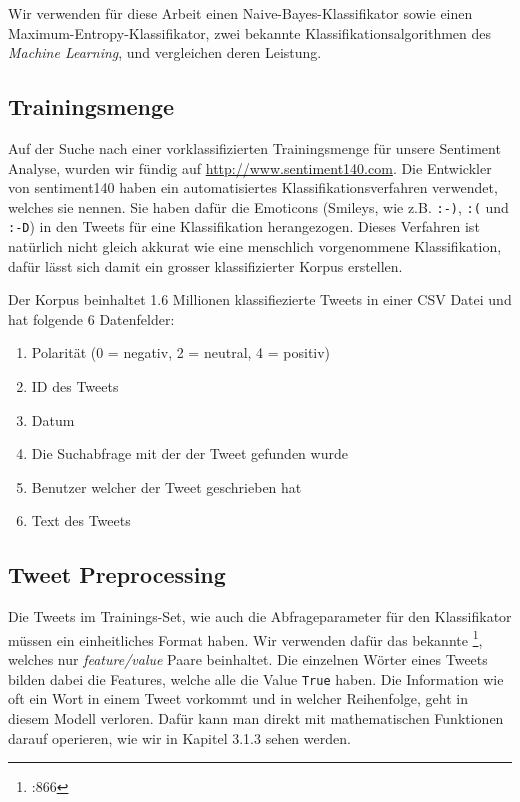 \documentclass[12pt, oneside]{report}   	%
\begin{document}
Wir verwenden für diese Arbeit einen Naive-Bayes-Klassifikator sowie einen Maximum-Entropy-Klassifikator, zwei bekannte Klassifikationsalgorithmen des \emph{Machine Learning}, und vergleichen deren Leistung.


\subsection{Trainingsmenge}

Auf der Suche nach einer vorklassifizierten Trainingsmenge für unsere Sentiment Analyse, wurden wir fündig auf \url{http://www.sentiment140.com}. 
Die Entwickler von sentiment140 haben ein automatisiertes Klassifikationsverfahren verwendet, welches sie  nennen. 
Sie haben dafür die  Emoticons (Smileys, wie z.B. \verb|:-)|, \verb|:(| und \verb|:-D|) in den Tweets für eine Klassifikation herangezogen. 
Dieses Verfahren ist natürlich nicht gleich akkurat wie eine menschlich vorgenommene Klassifikation, dafür lässt sich damit ein grosser klassifizierter Korpus erstellen.

Der Korpus beinhaltet 1.6 Millionen klassifiezierte Tweets in einer CSV Datei und hat folgende 6 Datenfelder:
\begin{enumerate}
\item Polarität (0 = negativ, 2 = neutral, 4 = positiv)
\item ID des Tweets
\item Datum
\item Die Suchabfrage mit der der Tweet gefunden wurde
\item Benutzer welcher der Tweet geschrieben hat
\item Text des Tweets
\end{enumerate}


\subsection{Tweet Preprocessing}
Die Tweets im Trainings-Set, wie auch die Abfrageparameter für den Klassifikator müssen ein einheitliches Format haben.
Wir verwenden dafür das bekannte \footnote{\cite{ai}:866}, welches nur \emph{feature/value} Paare beinhaltet.
Die einzelnen Wörter eines Tweets bilden dabei die Features, welche alle die Value \verb|True| haben.
Die Information wie oft ein Wort in einem Tweet vorkommt und in welcher Reihenfolge, geht in diesem Modell verloren. Dafür kann man direkt mit mathematischen Funktionen darauf operieren, wie wir in Kapitel 3.1.3 sehen werden.
\end{document}
